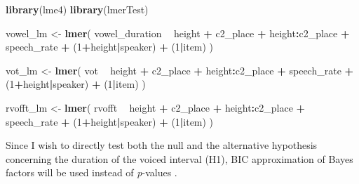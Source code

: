 \documentclass[11pt,]{article}
\newenvironment{Shaded}{\begin{snugshade}}{\end{snugshade}}
\newcommand{\DecValTok}[1]{\textcolor[rgb]{0.00,0.00,0.81}{#1}}
\newcommand{\KeywordTok}[1]{\textcolor[rgb]{0.13,0.29,0.53}{\textbf{#1}}}
\newcommand{\NormalTok}[1]{#1}
\newcommand{\OperatorTok}[1]{\textcolor[rgb]{0.81,0.36,0.00}{\textbf{#1}}}
\newcommand{\StringTok}[1]{\textcolor[rgb]{0.31,0.60,0.02}{#1}}
\begin{document}
\begin{Shaded}
\begin{Highlighting}[]
\KeywordTok{library}\NormalTok{(lme4)}
\KeywordTok{library}\NormalTok{(lmerTest)}

\NormalTok{vowel_lm <-}\StringTok{ }\KeywordTok{lmer}\NormalTok{(}
\NormalTok{  vowel_duration }\OperatorTok{~}
\StringTok{    }\NormalTok{height }\OperatorTok{+}
\StringTok{    }\NormalTok{c2_place }\OperatorTok{+}
\StringTok{    }\NormalTok{height}\OperatorTok{:}\NormalTok{c2_place }\OperatorTok{+}
\StringTok{    }\NormalTok{speech_rate }\OperatorTok{+}
\StringTok{    }\NormalTok{(}\DecValTok{1}\OperatorTok{+}\NormalTok{height}\OperatorTok{|}\NormalTok{speaker) }\OperatorTok{+}
\StringTok{    }\NormalTok{(}\DecValTok{1}\OperatorTok{|}\NormalTok{item)}
\NormalTok{)}

\NormalTok{vot_lm <-}\StringTok{ }\KeywordTok{lmer}\NormalTok{(}
\NormalTok{  vot }\OperatorTok{~}
\StringTok{    }\NormalTok{height }\OperatorTok{+}
\StringTok{    }\NormalTok{c2_place }\OperatorTok{+}
\StringTok{    }\NormalTok{height}\OperatorTok{:}\NormalTok{c2_place }\OperatorTok{+}
\StringTok{    }\NormalTok{speech_rate }\OperatorTok{+}
\StringTok{    }\NormalTok{(}\DecValTok{1}\OperatorTok{+}\NormalTok{height}\OperatorTok{|}\NormalTok{speaker) }\OperatorTok{+}
\StringTok{    }\NormalTok{(}\DecValTok{1}\OperatorTok{|}\NormalTok{item)}
\NormalTok{)}

\NormalTok{rvofft_lm <-}\StringTok{ }\KeywordTok{lmer}\NormalTok{(}
\NormalTok{  rvofft }\OperatorTok{~}
\StringTok{    }\NormalTok{height }\OperatorTok{+}
\StringTok{    }\NormalTok{c2_place }\OperatorTok{+}
\StringTok{    }\NormalTok{height}\OperatorTok{:}\NormalTok{c2_place }\OperatorTok{+}
\StringTok{    }\NormalTok{speech_rate }\OperatorTok{+}
\StringTok{    }\NormalTok{(}\DecValTok{1}\OperatorTok{+}\NormalTok{height}\OperatorTok{|}\NormalTok{speaker) }\OperatorTok{+}
\StringTok{    }\NormalTok{(}\DecValTok{1}\OperatorTok{|}\NormalTok{item)}
\NormalTok{)}
\end{Highlighting}
\end{Shaded}

Since I wish to directly test both the null and the alternative
hypothesis concerning the duration of the voiced interval (H1), BIC
approximation of Bayes factors will be used instead of \emph{p}-values
\citep{raftery1995, wagenmakers2007, jarosz2014}.
\end{document}
